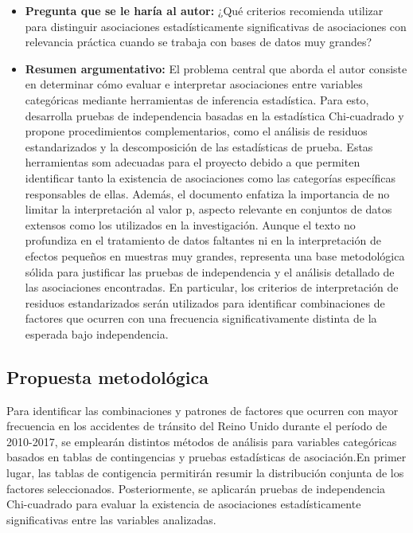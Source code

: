 \documentclass[12pt]{article}
\begin{document}
\begin{itemize}
\item \textbf{Pregunta que se le haría al autor:} ¿Qué criterios recomienda utilizar para distinguir asociaciones 
estadísticamente significativas de asociaciones con relevancia práctica cuando se trabaja con bases de datos muy grandes?

\item \textbf{Resumen argumentativo:} El problema central que aborda el autor consiste en determinar cómo evaluar e 
interpretar asociaciones entre variables categóricas mediante herramientas de inferencia estadística. Para esto, 
desarrolla pruebas de independencia basadas en la estadística Chi-cuadrado y propone procedimientos complementarios, 
como el análisis de residuos estandarizados y la descomposición de las estadísticas de prueba. Estas herramientas som 
adecuadas para el proyecto debido a que permiten identificar tanto la existencia de asociaciones como las categorías 
específicas responsables de ellas. Además, el documento enfatiza la importancia de no limitar la interpretación al valor p, 
aspecto relevante en conjuntos de datos extensos como los utilizados en la investigación. Aunque el texto no profundiza en 
el tratamiento de datos faltantes ni en la interpretación de efectos pequeños en muestras muy grandes, representa una base 
metodológica sólida para justificar las pruebas de independencia y el análisis detallado de las asociaciones encontradas. 
En particular, los criterios de interpretación de residuos estandarizados serán utilizados para identificar combinaciones 
de factores que ocurren con una frecuencia significativamente distinta de la esperada bajo independencia.\\
\end{itemize}

	
\subsection{Propuesta metodológica}

Para identificar las combinaciones y patrones de factores que ocurren con mayor frecuencia en los accidentes 
de tránsito del Reino Unido durante el período de 2010-2017, se emplearán distintos métodos de análisis para variables
categóricas basados en tablas de contingencias y pruebas estadísticas de asociación.En primer lugar, las tablas de contigencia
permitirán resumir la distribución conjunta de los factores seleccionados. Posteriormente, se aplicarán pruebas de independencia 
Chi-cuadrado para evaluar la existencia de asociaciones estadísticamente significativas entre las variables analizadas.
\end{document}
